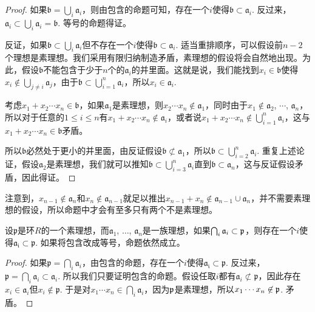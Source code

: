 \begin{proof}
	如果$\mathfrak{b}=\bigcup_i \mathfrak{a}_i$，则由包含的命题可知，存在一个$i$使得$\mathfrak{b}\subset \mathfrak{a}_i$. 反过来，$\mathfrak{a}_i\subset \bigcup_i \mathfrak{a}_i=\mathfrak{b}$. 等号的命题得证。

	反证，如果$\mathfrak{b}\subset \bigcup_i \mathfrak{a}_i$但不存在一个$i$使得$\mathfrak{b}\subset \mathfrak{a}_i$. 适当重排顺序，可以假设前$n-2$个理想是素理想。我们采用有限归纳制造矛盾，素理想的假设将会自然地出现。为此，假设$\mathfrak{b}$不能包含于少于$n$个的$\mathfrak{a}_i$的并里面。这就是说，我们能找到$x_i\in \mathfrak{b}$使得$x_i\not\in \bigcup_{j\neq i}\mathfrak{a}_j$，由于$\mathfrak{b}\subset \bigcup_{i=1}^n \mathfrak{a}_i$，所以$x_i\in \mathfrak{a}_i$.

	考虑$x_1+x_2\cdots x_n\in \mathfrak{b}$，如果$\mathfrak{a}_1$是素理想，则$x_2\cdots x_n\not\in \mathfrak{a}_1$，同时由于$x_1\not\in \mathfrak{a}_2$, $\cdots$, $\mathfrak{a}_n$，所以对于任意的$1\leq i \leq n$有$x_1+x_2\cdots x_n\not\in \mathfrak{a}_i$，或者说$x_1+x_2\cdots x_n\not\in \bigcup_{i=1}^n \mathfrak{a}_i$，这与$x_1+x_2\cdots x_n\in \mathfrak{b}$矛盾。

	所以$\mathfrak{b}$必然处于更小的并里面，由反证假设$\mathfrak{b}\not\subset \mathfrak{a}_1$，所以$\mathfrak{b}\subset \bigcup_{i=2}^n \mathfrak{a}_i$. 重复上述论证，假设$\mathfrak{a}_2$是素理想，我们就可以推知$\mathfrak{b}\subset \bigcup_{i=3}^n \mathfrak{a}_i$直到$\mathfrak{b}\subset \mathfrak{a}_n$，这与反证假设矛盾，因此得证。 
\end{proof}

注意到，$x_{n-1}\not\in \mathfrak{a}_n$和$x_{n}\not\in \mathfrak{a}_{n-1}$就足以推出$x_{n-1}+x_{n}\not\in \mathfrak{a}_{n-1}\cup \mathfrak{a}_n$，并不需要素理想的假设，所以命题中才会有至多只有两个不是素理想。

\begin{pro} \label{primeau}设$\mathfrak{p}$是环$R$的一个素理想，而$\mathfrak{a}_1$, $\dots$, $\mathfrak{a}_n$是一族理想，如果$\bigcap_i \mathfrak{a}_i\subset \mathfrak{p}$，则存在一个$i$使得$\mathfrak{a_i}\subset \mathfrak{p}$. 如果将包含改成等号，命题依然成立。
\end{pro}

\begin{proof}
	如果$\mathfrak{p}=\bigcap_i \mathfrak{a}_i$，由包含的命题，存在一个$i$使得$\mathfrak{a_i}\subset \mathfrak{p}$. 反过来，$\mathfrak{p}=\bigcap_i \mathfrak{a}_i\subset \mathfrak{a}_i$. 所以我们只要证明包含的命题。假设任取$i$都有$\mathfrak{a}_i\not\subset \mathfrak{p}$，因此存在$x_i\in\mathfrak{a}_i$但$x_i\not\in \mathfrak{p}$. 于是对$x_1\cdots x_n\in \bigcap_{i} \mathfrak{a}_i$，因为$\mathfrak{p}$是素理想，所以$x_1\cdots x_n\not\in \mathfrak{p}$. 矛盾。
\end{proof}

